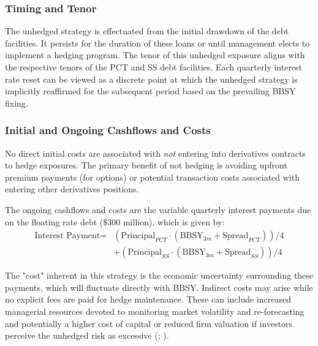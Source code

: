 \documentclass[11pt, a4paper, british]{article}
\begin{document}
\subsubsection{Timing and Tenor}
The unhedged strategy is effectuated from the initial drawdown of the debt facilities. It persists for the duration of these loans or until management elects to implement a hedging program. The tenor of this unhedged exposure aligns with the respective tenors of the PCT and SS debt facilities. Each quarterly interest rate reset can be viewed as a discrete point at which the unhedged strategy is implicitly reaffirmed for the subsequent period based on the prevailing BBSY fixing.
\subsubsection{Initial and Ongoing Cashflows and Costs}
No direct initial costs are associated with \emph{not} entering into derivatives contracts to hedge exposures. The primary benefit of not hedging is avoiding upfront premium payments (for options) or potential transaction costs associated with entering other derivatives positions.  

The ongoing cashflows and costs are the variable quarterly interest payments due on the floating rate debt (\$300 million), which is given by:
\begin{equation}
\begin{split}
    \text{Interest Payment} ={}& \left(\text{Principal}_{PCT} \cdot (\text{BBSY}_{3m} + \text{Spread}_{PCT}) \right) /4 \\
    & + \left(\text{Principal}_{SS} \cdot (\text{BBSY}_{3m} + \text{Spread}_{SS}) \right) /4
\end{split}
\end{equation}

The "cost" inherent in this strategy is the economic uncertainty surrounding these payments, which will fluctuate directly with BBSY. Indirect costs may arise while no explicit fees are paid for hedge maintenance. These can include increased managerial resources devoted to monitoring market volatility and re-forecasting and potentially a higher cost of capital or reduced firm valuation if investors perceive the unhedged risk as excessive (\cite{ss}; \cite{sr}).
\end{document}

